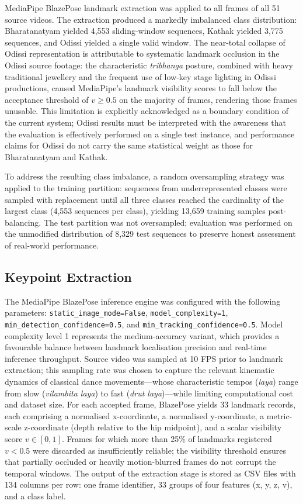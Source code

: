 \documentclass[journal]{IEEEtran}
\begin{document}
MediaPipe BlazePose landmark extraction was applied to all frames of all
51 source videos. The extraction produced a markedly imbalanced class
distribution: Bharatanatyam yielded 4,553 sliding-window sequences,
Kathak yielded 3,775 sequences, and Odissi yielded a single valid
window. The near-total collapse of Odissi representation is attributable
to systematic landmark occlusion in the Odissi source footage: the
characteristic \textit{tribhanga} posture, combined with heavy
traditional jewellery and the frequent use of low-key stage lighting
in Odissi productions, caused MediaPipe's landmark visibility scores
to fall below the acceptance threshold of $v \geq 0.5$ on the majority
of frames, rendering those frames unusable. This limitation is
explicitly acknowledged as a boundary condition of the current system;
Odissi results must be interpreted with the awareness that the evaluation
is effectively performed on a single test instance, and performance
claims for Odissi do not carry the same statistical weight as those
for Bharatanatyam and Kathak.

To address the resulting class imbalance, a random oversampling strategy
was applied to the training partition: sequences from underrepresented
classes were sampled with replacement until all three classes reached
the cardinality of the largest class (4,553 sequences per class),
yielding 13,659 training samples post-balancing. The test partition was
not oversampled; evaluation was performed on the unmodified distribution
of 8,329 test sequences to preserve honest assessment of real-world
performance.

\subsection{Keypoint Extraction}

The MediaPipe BlazePose inference engine was configured with the
following parameters: \texttt{static\_image\_mode=False},
\texttt{model\_complexity=1}, \texttt{min\_detection\_confidence=0.5},
and \texttt{min\_tracking\_confidence=0.5}. Model complexity level 1
represents the medium-accuracy variant, which provides a
favourable balance between landmark localisation precision and
real-time inference throughput. Source video was sampled at 10 FPS
prior to landmark extraction; this sampling rate was chosen to capture
the relevant kinematic dynamics of classical dance movements—whose
characteristic tempos (\textit{laya}) range from slow (\textit{vilambita
laya}) to fast (\textit{drut laya})—while limiting computational cost
and dataset size. For each accepted frame, BlazePose yields 33 landmark
records, each comprising a normalised x-coordinate, a normalised
y-coordinate, a metric-scale z-coordinate (depth relative to the hip
midpoint), and a scalar visibility score $v \in [0, 1]$. Frames for
which more than 25\% of landmarks registered $v < 0.5$ were discarded
as insufficiently reliable; the visibility threshold ensures that
partially occluded or heavily motion-blurred frames do not corrupt
the temporal windows. The output of the extraction stage is stored as
CSV files with 134 columns per row: one frame identifier, 33 groups
of four features (x, y, z, v), and a class label.
\end{document}
